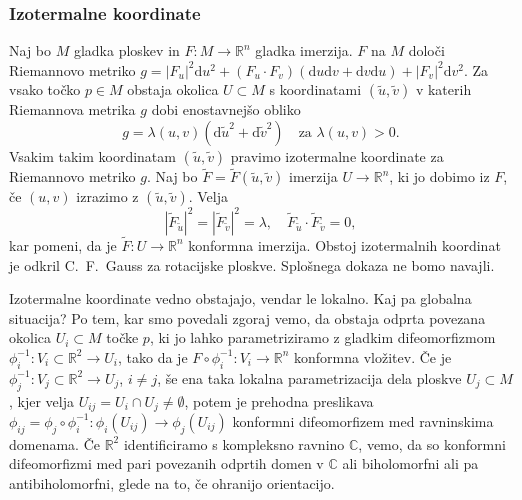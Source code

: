 \documentclass[8pt]{beamer}
\theoremstyle{definition}
\theoremstyle{remark}
\theoremstyle{plain}
\numberwithin{equation}{section}  %
\begin{document}
\begin{frame}
    \frametitle{Izotermalne koordinate}

    Naj bo $M$ gladka ploskev in $F: M \rightarrow \mathbb{R}^n$ gladka imerzija. $F$ na $M$ določi \textcolor{red1}{Riemannovo metriko} $g=\left|F_u\right|^2 \mathrm{d} u^2+\left(F_u \cdot F_v\right)(\mathrm{d} u \mathrm{d} v+\mathrm{d} v \mathrm{d} u)+\left|F_v\right|^2 \mathrm{d} v^2$. Za vsako točko $p \in M$ obstaja okolica $U \subset M$ s koordinatami $(\tilde{u}, \tilde{v})$ v katerih Riemannova metrika $g$ dobi enostavnejšo obliko 
    \begin{equation*}
        g=\lambda(u,v)\left(\mathrm{d} \tilde{u}^2+\mathrm{d} \tilde{v}^2\right) \quad \text{za } \lambda(u,v) > 0.
    \end{equation*}
    Vsakim takim koordinatam $(\tilde{u}, \tilde{v})$ pravimo \textcolor{red1}{izotermalne koordinate} za Riemannovo metriko $g$. Naj bo $\widetilde{F}=\widetilde{F}(\tilde{u}, \tilde{v})$ imerzija $U \rightarrow \mathbb{R}^n$, ki jo dobimo iz $F$, če $(u, v)$ izrazimo z $(\tilde{u}, \tilde{v})$. Velja 
    \begin{equation*}
        \left|\widetilde{F}_{\tilde{u}}\right|^2=\left|\widetilde{F}_{\tilde{v}}\right|^2=\lambda, \quad \widetilde{F}_{\tilde{u}} \cdot \widetilde{F}_{\tilde{v}}=0,
    \end{equation*}
    kar pomeni, da je $\widetilde{F}: U \rightarrow \mathbb{R}^n$ konformna imerzija. Obstoj izotermalnih koordinat je odkril C.~F.~Gauss za rotacijske ploskve. Splošnega dokaza ne bomo navajli.

    \vspace{0.8em}

    Izotermalne koordinate vedno obstajajo, vendar le lokalno. Kaj pa \textcolor{red1}{globalna situacija}? Po tem, kar smo povedali zgoraj vemo, da obstaja odprta povezana okolica $U_i\subset M$ točke $p$, ki jo lahko parametriziramo z gladkim difeomorfizmom $\phi_i^{-1}: V_i\subset \mathbb{R}^2 \rightarrow U_i$, tako da je $F \circ \phi_i^{-1}: V_i \rightarrow \mathbb{R}^n$ konformna vložitev. Če je $\phi_j^{-1}:V_j\subset \mathbb{R}^2 \rightarrow U_j$, $i\neq j$, še ena taka lokalna parametrizacija dela ploskve $U_j\subset M$, kjer velja $U_{ij}=U_i\cap U_j \neq \emptyset$, potem je \textcolor{red1}{prehodna preslikava} $\phi_{ij}=\phi_j \circ \phi_i^{-1}: \phi_i\left(U_{i j}\right) \rightarrow \phi_j\left(U_{i j}\right)$ konformni difeomorfizem med ravninskima domenama. Če $\mathbb{R}^2$ identificiramo s kompleksno ravnino $\mathbb{C}$, vemo, da so konformni difeomorfizmi med pari povezanih odprtih domen v $\mathbb{C}$ ali biholomorfni ali pa antibiholomorfni, glede na to, če ohranijo orientacijo. 
    
\end{frame}
\end{document}
